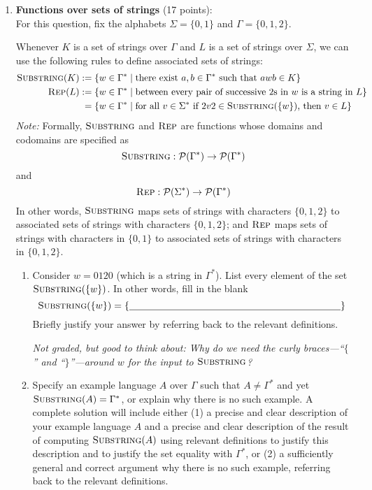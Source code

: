 \begin{enumerate}[wide, labelwidth=!, labelindent=0pt]
    \item \textbf{Functions over sets of strings} (17 points): \\
    For this question, fix the alphabets $\Sigma = \{0,1\}$ and
    $\Gamma = \{0,1,2\}$.

    Whenever $K$ is a set of strings over $\Gamma$ and 
    $L$ is a set of strings over $\Sigma$, 
    we can use the following 
    rules to define associated sets of strings:
    \begin{align*}
    \textsc{Substring}(K) &:= \{ w \in \Gamma^* \mid \text{there exist } a,b \in \Gamma^* \text{ such that } awb \in K\} \\
    \textsc{Rep}(L) &:= \{ w \in \Gamma^* \mid \text{between every 
    pair of successive $2$s in $w$ is a string in $L$}\}\\
    &\phantom{:}=\{w \in \Gamma^* \mid \text{for all } v \in \Sigma^* \text{ if } 2v2 \in \textsc{Substring}(\{w\})  \text{, then } v \in L\}
    \end{align*}
    \textit{Note:} Formally, $\textsc{Substring}$ and $\textsc{Rep}$ are functions
    whose domains and codomains are specified as
    $$\textsc{Substring}: \mathcal{P}(\Gamma^*) \to \mathcal{P}(\Gamma^*)$$ 
    and 
    $$\textsc{Rep}: \mathcal{P}(\Sigma^*) \to \mathcal{P}(\Gamma^*)$$
    In other words, $\textsc{Substring}$ maps sets of strings with characters $\{0,1,2\}$ to associated
    sets of strings with characters $\{0,1,2\}$; and $\textsc{Rep}$ maps sets of strings with characters 
    in $\{0,1\}$ to associated sets of strings with characters in $\{0,1,2\}$.
    \begin{enumerate}
    \item \gradeCorrectFirst Consider $w = 0120$ (which is a string in $\Gamma^*$). 
    List every element of the set $\textsc{Substring}(\{w\})$. 
    In other words, fill in the blank
    \[
    \SUBSTRING(\{w\}) = \{ \underline{\phantom{\hspace{3in}}} \}
    \]
    Briefly justify your answer by referring back to the relevant definitions.

    {\it Not graded, but good to think about: Why do we need the curly braces---``$\{$'' and ``$\}$''---around $w$ for the input to $\textsc{Substring}$?}

    \item\gradeCorrect Specify an example language $A$ over $\Gamma$ such that 
    $A \neq \Gamma^*$ and yet $\textsc{Substring}(A) = \Gamma^*$, 
    or explain why there is no such example. 
    A complete solution will include either (1) a precise and
    clear description of your example language $A$ 
    and a precise and clear description of
    the result of computing $\textsc{Substring}(A)$ using relevant definitions 
    to justify this description and to justify the set equality with 
    $\Gamma^*$, or (2) a sufficiently general and correct argument
    why there is no such example, referring back to the relevant definitions.


\end{enumerate}
\end{enumerate}
